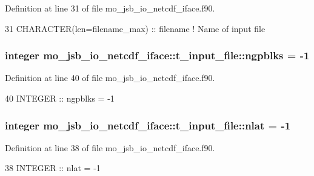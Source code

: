 Definition at line 31 of file mo\+\_\+jsb\+\_\+io\+\_\+netcdf\+\_\+iface.\+f90.


\begin{DoxyCode}
31     \textcolor{keywordtype}{CHARACTER(len=filename\_max)} :: filename  \textcolor{comment}{! Name of input file}
\end{DoxyCode}
\hypertarget{structmo__jsb__io__netcdf__iface_1_1t__input__file_a72c61d8ce8fe77682b939d038caeb22e}{}
\subsubsection[{ngpblks}]{\setlength{\rightskip}{0pt plus 5cm}integer mo\+\_\+jsb\+\_\+io\+\_\+netcdf\+\_\+iface\+::t\+\_\+input\+\_\+file\+::ngpblks = -\/1}\label{structmo__jsb__io__netcdf__iface_1_1t__input__file_a72c61d8ce8fe77682b939d038caeb22e}


Definition at line 40 of file mo\+\_\+jsb\+\_\+io\+\_\+netcdf\+\_\+iface.\+f90.


\begin{DoxyCode}
40     \textcolor{keywordtype}{INTEGER} :: ngpblks = -1
\end{DoxyCode}
\hypertarget{structmo__jsb__io__netcdf__iface_1_1t__input__file_abb986987561381c65a057e7030c1a8de}{}
\subsubsection[{nlat}]{\setlength{\rightskip}{0pt plus 5cm}integer mo\+\_\+jsb\+\_\+io\+\_\+netcdf\+\_\+iface\+::t\+\_\+input\+\_\+file\+::nlat = -\/1}\label{structmo__jsb__io__netcdf__iface_1_1t__input__file_abb986987561381c65a057e7030c1a8de}


Definition at line 38 of file mo\+\_\+jsb\+\_\+io\+\_\+netcdf\+\_\+iface.\+f90.


\begin{DoxyCode}
38     \textcolor{keywordtype}{INTEGER} :: nlat    = -1
\end{DoxyCode}
\hypertarget{structmo__jsb__io__netcdf__iface_1_1t__input__file_a621db761fc46e096067d4dd273e9700a}{}
